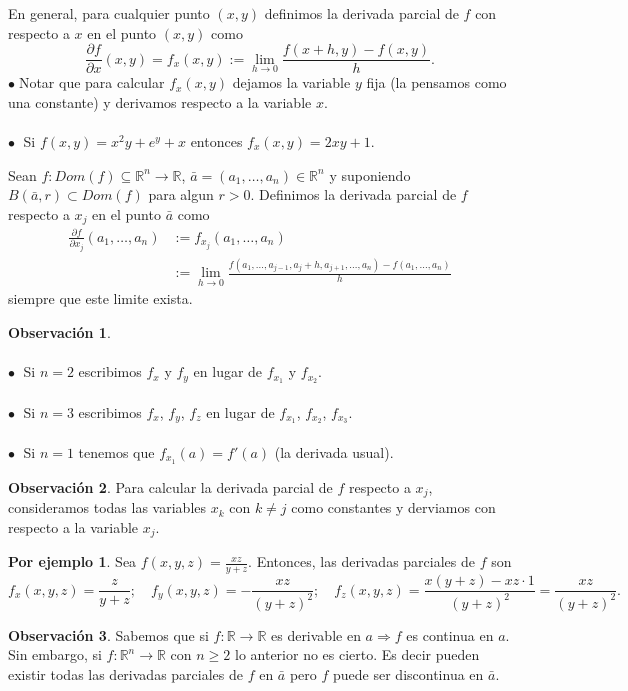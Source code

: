 \documentclass{article}
\theoremstyle{definition}
\newtheorem*{obs}{Observación}
\newtheorem*{ej}{Por ejemplo}
\theoremstyle{remark}
\newcommand\bl{$\bullet\;$}
\begin{document}
En general, para cualquier punto $(x,y)$ definimos la derivada parcial de $f$ con respecto a $x$ en el punto $(x,y)$ como \[
  \frac{\partial f}{\partial x} (x,y) = f_x (x,y) := \lim_{h \to 0}{\frac{f(x+h,y)-f(x,y)}{h}}.
\]
\bl Notar que para calcular $f_x(x,y)$ dejamos la variable $y$ fija (la pensamos como una constante) y derivamos respecto a la variable $x$. \\\\
\bl
  Si $f(x,y)=x^2y+e^y+x$ entonces $f_x(x,y)=2xy+1$.
  \begin{defi}
    Sean $f : Dom(f) \subseteq \mathbb{R}^n \to \mathbb{R}$, $\bar{a}=(a_1,\dots,a_n) \in \mathbb{R}^n$ y suponiendo $B(\bar{a},r) \subset Dom(f)$ para algun $r>0$. Definimos la derivada parcial de $f$ respecto a $x_j$ en el punto $\bar{a}$ como \[\begin{aligned}
      \frac{\partial f}{\partial x_j}(a_1,\dots,a_n) &:= f_{x_j}(a_1,\dots,a_n)
  \\  &:= \lim_{h \to 0}{\frac{f(a_1,\dots,a_{j-1},a_{j}+h,a_{j+1},\dots,a_n)-f(a_1,\dots,a_n)}{h}}
    \end{aligned}
    \] siempre que este limite exista.
  \end{defi}
\begin{obs}
  \; \\\\  
  \textcolor{verdep2}{\bl} Si $n=2$ escribimos $f_x$ y $f_y$ en lugar de $f_{x_1}$ y $f_{x_2}$. \\\\
  \textcolor{verdep2}{\bl} Si $n=3$ escribimos $f_x$, $f_y$, $f_z$ en lugar de $f_{x_1}$, $f_{x_2}$, $f_{x_3}$.\\\\
  \textcolor{verdep2}{\bl} Si $n=1$ tenemos que $f_{x_1}(a)=f'(a)$ \quad (la derivada usual).
\end{obs}
\begin{obs}
  Para calcular la derivada parcial de $f$ respecto a $x_j$, consideramos todas las variables $x_k$ con $k \neq j$ como constantes y derviamos con respecto a la variable $x_j$. 
\end{obs}
\begin{ej}
  Sea $f(x,y,z) = \frac{xz}{y+z}$. Entonces, las derivadas parciales de $f$ son \[ 
    f_x(x,y,z)=\frac{z}{y+z}; \quad f_y(x,y,z)=-\frac{xz}{(y+z)^2}; \quad f_z(x,y,z)=\frac{x(y+z)-xz \cdot 1}{(y+z)^2}=\frac{xz}{(y+z)^2}.
  \] 
\end{ej}
\begin{obs}
  Sabemos que si $f : \mathbb{R} \to \mathbb{R}$ es derivable en $a \Rightarrow f$ es continua en $a$. Sin embargo, si $f: \mathbb{R}^n \to \mathbb{R}$ con $n \geq 2$ lo anterior no es cierto. Es decir pueden existir todas las derivadas parciales de $f$ en $\bar{a}$ pero $f$ puede ser discontinua en $\bar{a}$.\end{obs}
\end{document}
